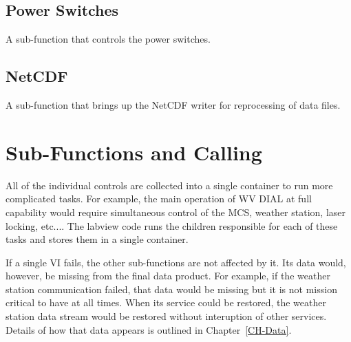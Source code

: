 \subsection{Power Switches}\label{Sec:PowSwitchSubFunction}

A sub-function that controls the power switches.

\subsection{NetCDF}\label{Sec:NetCDFSubFunction}

A sub-function that brings up the NetCDF writer for reprocessing of data files.





\section{Sub-Functions and Calling}

All of the individual controls are collected into a single container to run more complicated tasks. For example, the main operation of WV DIAL at full capability would require simultaneous control of the MCS, weather station, laser locking, etc.... The labview code runs the children responsible for each of these tasks and stores them in a single container. 

If a single VI fails, the other sub-functions are not affected by it. Its data would, however, be missing from the final data product. For example, if the weather station communication failed, that data would be missing but it is not mission critical to have at all times. When its service could be restored, the weather station data stream would be restored without interuption of other services. Details of how that data appears is outlined in Chapter~\ref{CH-Data}.

\newpage 
